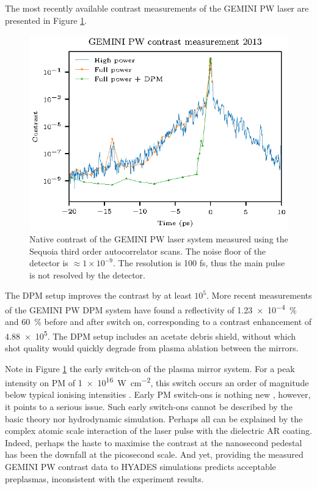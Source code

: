 The most recently available contrast measurements of the GEMINI PW laser are presented in Figure \ref{fig:geminicontrast}. 
\begin{figure}
	\centering
	\includegraphics{figures/gemini/gemini_contrast}
	\caption[Native contrast of the GEMINI PW laser system.]{Native contrast of the GEMINI PW laser system measured using the Sequoia third order autocorrelator scans. The noise floor of the detector is $\approx 1\times 10^{-9}$. The resolution is 100 fs, thus the main pulse is not resolved by the detector.}
	\label{fig:geminicontrast}
\end{figure}
The \ac{DPM} setup improves the contrast by at least $10^5$. More recent measurements of the GEMINI PW DPM system have found a reflectivity of \qty{1.23e-4}{\%} and \qty{60}{\%} before and after switch on, corresponding to a contrast enhancement of \num{4.88e5}. The DPM setup includes an acetate debris shield, without which shot quality would quickly degrade from plasma ablation between the mirrors.

Note in Figure \ref{fig:geminicontrast} the early switch-on of the plasma mirror system. For a peak intensity on \ac{PM} of \qty{1e16}{W.cm^{-2}}, this switch occurs an order of magnitude below typical ionising intensities \cite{umstadterRelativisticLaserPlasma2003}. Early PM switch-ons is nothing new \cite{caiTimeresolvedMeasurementsReflectivity2009}, however, it points to a serious issue. Such early switch-ons cannot be described by the basic theory nor hydrodynamic simulation. Perhaps all can be explained by the complex atomic scale interaction of the laser pulse with the dielectric AR coating. Indeed, perhaps the haste to maximise the contrast at the nanosecond pedestal has been the downfall at the picosecond scale. And yet, providing the measured GEMINI PW contrast data to HYADES simulations predicts acceptable preplasmas, inconsistent with the experiment results. 

